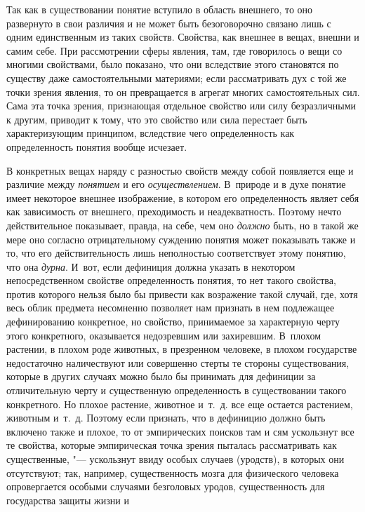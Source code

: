 Так как в существовании понятие вступило в область внешнего,
то оно развернуто в свои различия и не может быть безоговорочно связано
лишь с одним единственным из таких свойств. Свойства, как внешнее в вещах,
внешни и самим себе. При рассмотрении сферы явления, там, где говорилось о
вещи со многими свойствами, было показано, что они вследствие этого
становятся по существу даже самостоятельными материями; если рассматривать
дух с той же точки зрения явления, то он превращается в агрегат многих
самостоятельных сил. Сама эта точка зрения, признающая отдельное свойство
или силу безразличными к другим, приводит к тому, что это свойство или сила
перестает быть характеризующим принципом, вследствие чего определенность
как определенность понятия вообще исчезает.

В конкретных вещах наряду с разностью свойств между собой
появляется еще и различие между {\em понятием} и его {\em осуществлением}.
В~природе и в духе понятие имеет некоторое внешнее изображение, в котором его
определенность являет себя как зависимость от внешнего, преходимость и
неадекватность. Поэтому нечто действительное показывает, правда, на себе,
чем оно {\em должно}
быть, но в такой же мере оно согласно отрицательному суждению
понятия может показывать также и то, что его действительность лишь
неполностью соответствует этому понятию, что она {\em дурна}. И~вот, если
дефиниция должна указать в некотором непосредственном свойстве
определенность понятия, то нет такого свойства, против которого нельзя было
бы привести как возражение такой случай, где, хотя весь облик предмета
несомненно позволяет нам признать в нем подлежащее
дефинированию конкретное, но свойство, принимаемое за характерную черту
этого конкретного, оказывается недозревшим или захиревшим. В~плохом
растении, в плохом роде животных, в презренном человеке, в плохом
государстве недостаточно наличествуют или совершенно стерты те стороны
существования, которые в других случаях можно было бы принимать для
дефиниции за отличительную черту и существенную определенность в
существовании такого конкретного. Но плохое растение, животное и~т.~д. все
еще остается растением, животным и~т.~д. Поэтому если признать, что в
дефиницию должно быть включено также и плохое, то от эмпирических поисков
там и сям ускользнут все те свойства, которые эмпирическая точка зрения
пыталась рассматривать как существенные, "--- ускользнут ввиду
особых случаев (уродств), в которых они отсутствуют; так, например,
существенность мозга для физического человека опровергается особыми
случаями безголовых уродов, существенность для государства защиты жизни и
